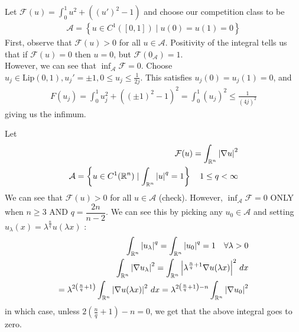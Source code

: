\documentclass{memoir}
\begin{document}
\begin{exmp}
	Let \(\mathcal{F}(u) = \int_{0}^{1} u^2+((u')^2-1) \) and choose our competition class to be
	\begin{align*}
		\mathcal{A} = \left\{u \in C^{1}([0,1]) \mid u(0)=u(1)=0 \right\} 
	\end{align*}
	First, observe that \(\mathcal{F}(u) > 0\) for all \(u \in \mathcal{A}\). Positivity of the integral tells us that if \(\mathcal{F}(u) = 0\) then \(u=0\), but \(\mathcal{F}(0_{\mathcal{A}}) = 1\).\\

	However, we can see that \(\inf_{\mathcal{A}} \mathcal{F} = 0\). Choose \(u_j \in \textrm{Lip}(0,1), u_j' = \pm 1, 0\leq u_j\leq \frac{1}{2j}\). This satisfies \(u_j(0) = u_j(1) = 0\), and
	\begin{align*}
		F(u_j) = \int_{0}^{1} u_j^2 + \left( (\pm 1)^2 - 1 \right)^2 = \int_{0}^{1} (u_j)^2 \leq  \frac{1}{(4j)^2} 
	\end{align*}
	giving us the infimum.
\end{exmp}

\begin{exmp}
	Let
	\begin{align*}
		\mathcal{F}(u) = \int_{\mathbb{R}^{n}}\left| \nabla u \right|^2\\
		\mathcal{A} = \left\{u \in C^{1}(\mathbb{R}^{n}) \mid \int_{\mathbb{R}^{n}}\left| u \right|^{q}=1 \right\} \quad 1\leq q<\infty
	\end{align*}
	We can see that \(\mathcal{F}(u) > 0\) for all \(u \in \mathcal{A}\) (check). However, \(\inf_{\mathcal{A}} \mathcal{F} = 0\) ONLY when \(n\geq 3\) AND \(q = \dfrac{2n}{n-2}\). We can see this by picking any \(u_0 \in \mathcal{A}\) and setting \(u_\lambda (x) = \lambda^{\frac{n}{q}}u(\lambda x)\) :
	\begin{align*}
		\int_{\mathbb{R}^{n}}\left| u_\lambda  \right|^{q} = \int_{\mathbb{R}^{n}} \left| u_0 \right|^{q} = 1 \quad \forall \lambda >0\\
		\int_{\mathbb{R}^{n}}\left| \nabla u_\lambda  \right|^2 = \int_{\mathbb{R}^{n}} \left| \lambda^{\frac{n}{q}+1} \nabla u(\lambda x) \right|^2 \,d x\\
		= \lambda^{2\left( \frac{n}{q}+1 \right) } \int_{\mathbb{R}^{n}} \left| \nabla u(\lambda x) \right|^2 \,d x = \lambda^{2\left( \frac{n}{q}+1 \right) -n} \int_{\mathbb{R}^{n}} \left| \nabla u_0 \right|^2
	\end{align*}
	in which case, unless \(2\left( \frac{n}{q}+1 \right) -n = 0\), we get that the above integral goes to zero.
\end{exmp}
\end{document}
